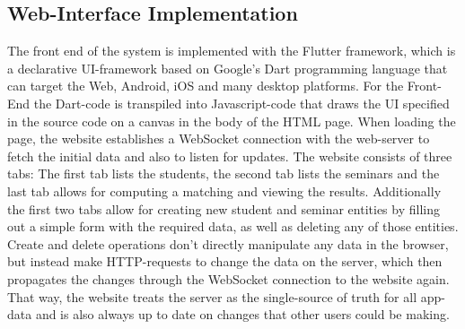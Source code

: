 \subsection{Web-Interface Implementation}
The front end of the system is implemented with the Flutter framework, which is a declarative UI-framework based on Google's Dart programming language that can target the Web, Android, iOS and many desktop platforms. For the Front-End the Dart-code is transpiled into Javascript-code that draws the UI specified in the source code on a canvas in the body of the HTML page. When loading the page, the website establishes a WebSocket connection with the web-server to fetch the initial data and also to listen for updates. 
The website consists of three tabs: The first tab lists the students, the second tab lists the seminars and the last tab allows for computing a matching and viewing the results. Additionally the first two tabs allow for creating new student and seminar entities by filling out a simple form with the required data, as well as deleting any of those entities. Create and delete operations don't directly manipulate any data in the browser, but instead make HTTP-requests to change the data on the server, which then propagates the changes through the WebSocket connection to the website again. That way, the website treats the server as the single-source of truth for all app-data and is also always up to date on changes that other users could be making.
